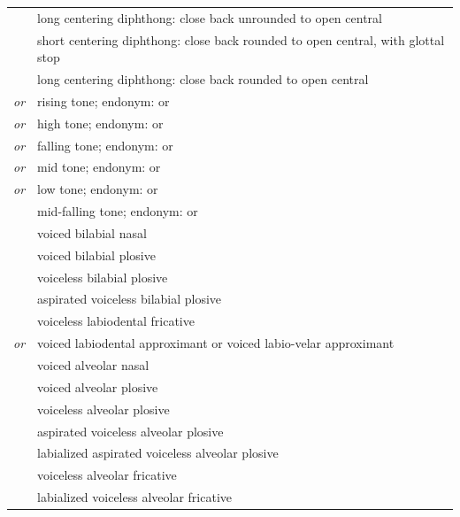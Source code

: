 \documentclass{article}
\begin{document}
\begin{xltabular}{\textwidth}{lL}
   & long centering diphthong: close back unrounded to open central \\
   & short centering diphthong: close back rounded to open central, with glottal stop \\
   & long centering diphthong: close back rounded to open central \\
   \textit{or} \ipa{\v{}} & rising tone; endonym:  or  \\
   \textit{or} \ipa{\'{}} & high tone; endonym:  or  \\
   \textit{or} \ipa{\^{}} & falling tone; endonym:  or  \\
   \textit{or} \ipa{\={}} & mid tone; endonym:  or  \\
   \textit{or} \ipa{\`{}} & low tone; endonym:  or  \\
   & mid-falling tone; endonym:  or  \\
   & voiced bilabial nasal \\
   & voiced bilabial plosive \\
   & voiceless bilabial plosive \\
   & aspirated voiceless bilabial plosive \\
   & voiceless labiodental fricative \\
   \textit{or}  & voiced labiodental approximant or voiced labio-velar approximant \\
   & voiced alveolar nasal \\
   & voiced alveolar plosive \\
   & voiceless alveolar plosive \\
   & aspirated voiceless alveolar plosive \\
   & labialized aspirated voiceless alveolar plosive \\
   & voiceless alveolar fricative \\
   & labialized voiceless alveolar fricative \\

\end{xltabular}
\end{document}
